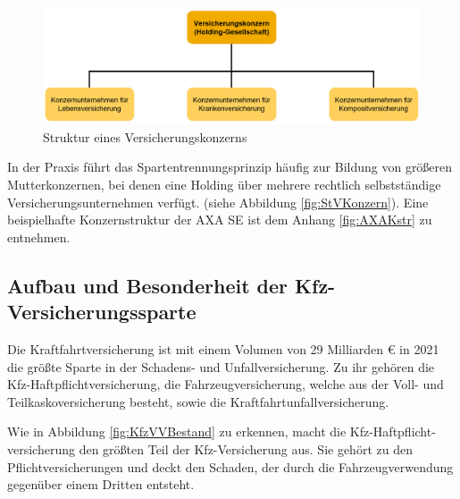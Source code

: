 \begin{figure}[h]
    \centering
    \includegraphics[width=1\textwidth]{img/Struktur_VKonzern2.jpg}
    \caption[Struktur eines Versicherungskonzerns]{Struktur eines Versicherungskonzerns\autocite{StVKonzern}}
    \label{fig:StVKonzern}
\end{figure}


In der Praxis führt das Spartentrennungsprinzip häufig zur Bildung von größeren Mutterkonzernen, bei denen eine Holding über mehrere rechtlich selbstständige Versicherungsunternehmen verfügt. (siehe Abbildung \vref{fig:StVKonzern}). Eine beispielhafte Konzernstruktur der AXA SE ist dem Anhang \ref{fig:AXAKstr} zu entnehmen. 

\subsection{Aufbau und Besonderheit der Kfz-Versicherungssparte}

Die Kraftfahrtversicherung ist mit einem Volumen von 29 Milliarden € in 2021 die größte Sparte in der Schadens- und Unfallversicherung.\autocite[Vgl.][]{GDVSUV} Zu ihr gehören die Kfz-Haftpflichtversicherung, die Fahrzeugversicherung, welche aus der Voll- und Teilkaskoversicherung besteht, sowie die Kraftfahrtunfallversicherung.\autocite[Vgl.][S. 8]{MURINGER2000}

Wie in Abbildung \vref{fig:KfzVVBestand} zu erkennen, macht die Kfz-Haftpflicht- versicherung den größten Teil der Kfz-Versicherung aus. Sie gehört zu den Pflichtversicherungen und deckt den Schaden, der durch die Fahrzeugverwendung gegenüber einem Dritten entsteht. \autocite[Vgl.][S. 81]{STADLER2008}

